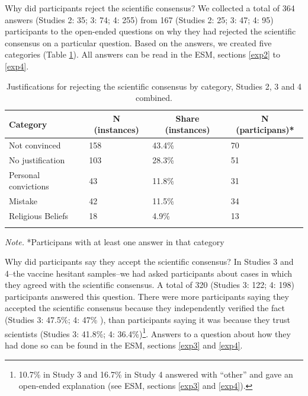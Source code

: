 \documentclass[
  doc,floatsintext]{apa6}
\begin{document}
Why did participants reject the scientific consensus? We collected a total of 364 answers (Studies 2: 35; 3: 74; 4: 255) from 167 (Studies 2: 25; 3: 47; 4: 95) participants to the open-ended questions on why they had rejected the scientific consensus on a particular question. Based on the answers, we created five categories (Table \ref{tab:justifications}). All answers can be read in the ESM, sections \ref{exp2} to \ref{exp4}.

\begin{table}[tbp]

\begin{center}
\begin{threeparttable}

\caption{\label{tab:justifications}Justifications for rejecting the scientific consensus by category, Studies 2, 3 and 4 combined.}

\begin{tabular}{llll}
\toprule
Category & \multicolumn{1}{c}{N (instances)} & \multicolumn{1}{c}{Share (instances)} & \multicolumn{1}{c}{N (participans)*}\\
\midrule
Not convinced & 158 & 43.4\% & 70\\
No justification & 103 & 28.3\% & 51\\
Personal convictions & 43 & 11.8\% & 31\\
Mistake & 42 & 11.5\% & 34\\
Religious Beliefs & 18 & 4.9\% & 13\\
\bottomrule
\addlinespace
\end{tabular}

\begin{tablenotes}[para]
\normalsize{\textit{Note.} *Participans with at least one answer in that category}
\end{tablenotes}

\end{threeparttable}
\end{center}

\end{table}

Why did participants say they accept the scientific consensus? In Studies 3 and 4--the vaccine hesitant samples--we had asked participants about cases in which they agreed with the scientific consensus. A total of 320 (Studies 3: 122; 4: 198) participants answered this question. There were more participants saying they accepted the scientific consensus because they independently verified the fact (Studies 3: 47.5\%; 4: 47\% ), than participants saying it was because they trust scientists (Studies 3: 41.8\%; 4: 36.4\%)\footnote{10.7\% in Study 3 and 16.7\% in Study 4 answered with ``other'' and gave an open-ended explanation (see ESM, sections \ref{exp3} and \ref{exp4}).}. Answers to a question about how they had done so can be found in the ESM, sections \ref{exp3} and \ref{exp4}.
\end{document}
